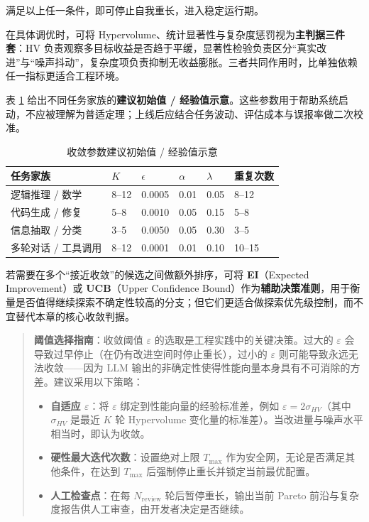 满足以上任一条件，即可停止自我重长，进入稳定运行期。

在具体调优时，可将 Hypervolume、统计显著性与复杂度惩罚视为\textbf{主判据三件套}：HV 负责观察多目标收益是否趋于平缓，显著性检验负责区分“真实改进”与“噪声抖动”，复杂度项负责抑制无收益膨胀。三者共同作用时，比单独依赖任一指标更适合工程环境。

表 \ref{tab:convergence_initial_values} 给出不同任务家族的\textbf{建议初始值 / 经验值示意}。这些参数用于帮助系统启动，不应被理解为普适定理；上线后应结合任务波动、评估成本与误报率做二次校准。

\begin{table}[htbp]
\centering
\caption{收敛参数建议初始值 / 经验值示意}
\label{tab:convergence_initial_values}
\begin{tabular}{p{3.2cm}p{1.2cm}p{1.5cm}p{1.2cm}p{1.4cm}p{1.8cm}}
\hline
\textbf{任务家族} & \textbf{$K$} & \textbf{$\epsilon$} & \textbf{$\alpha$} & \textbf{$\lambda$} & \textbf{重复次数} \\
\hline
逻辑推理 / 数学 & 8--12 & 0.0005 & 0.01 & 0.05 & 8--12 \\
代码生成 / 修复 & 5--8 & 0.0010 & 0.05 & 0.15 & 5--8 \\
信息抽取 / 分类 & 3--5 & 0.0050 & 0.05 & 0.30 & 3--5 \\
多轮对话 / 工具调用 & 8--12 & 0.0001 & 0.01 & 0.10 & 10--15 \\
\hline
\end{tabular}
\end{table}

若需要在多个“接近收敛”的候选之间做额外排序，可将 \textbf{EI}（Expected Improvement）或 \textbf{UCB}（Upper Confidence Bound）作为\textbf{辅助决策准则}，用于衡量是否值得继续探索不确定性较高的分支；但它们更适合做探索优先级控制，而不宜替代本章的核心收敛判据。

\begin{quote}
\textbf{阈值选择指南}：收敛阈值 $\varepsilon$ 的选取是工程实践中的关键决策。过大的 $\varepsilon$ 会导致过早停止（在仍有改进空间时停止重长），过小的 $\varepsilon$ 则可能导致永远无法收敛——因为 LLM 输出的非确定性使得性能向量本身具有不可消除的方差。建议采用以下策略：
\begin{itemize}
    \item \textbf{自适应 $\varepsilon$}：将 $\varepsilon$ 绑定到性能向量的经验标准差，例如 $\varepsilon = 2\sigma_{HV}$（其中 $\sigma_{HV}$ 是最近 $K$ 轮 Hypervolume 变化量的标准差）。当改进量与噪声水平相当时，即认为收敛。
    \item \textbf{硬性最大迭代次数}：设置绝对上限 $T_{\max}$ 作为安全网，无论是否满足其他条件，在达到 $T_{\max}$ 后强制停止重长并锁定当前最优配置。
    \item \textbf{人工检查点}：在每 $N_{\text{review}}$ 轮后暂停重长，输出当前 Pareto 前沿与复杂度报告供人工审查，由开发者决定是否继续。
\end{itemize}
\end{quote}

